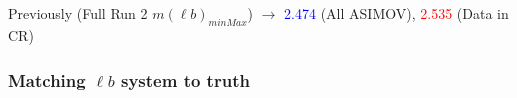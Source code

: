 \documentclass[]{article}
\begin{document}
\begin{figure}[!h]
\begin{subfigure}[b]{0.4\textwidth}
	\end{subfigure}
\end{figure}

\\\\
Previously (Full Run 2 $m(\ell b)_{minMax}$) $\rightarrow$ \textcolor{blue}{2.474} (All ASIMOV), \textcolor{red}{2.535} (Data in CR)


\subsubsection{Matching $\ell b$ system to truth}
\end{document}
